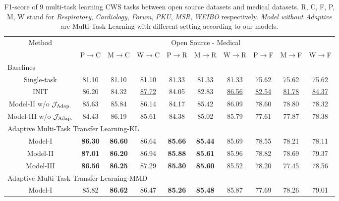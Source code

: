 \begin{table*}[t!]
\small
\centering
\caption{F1-score of 9 multi-task learning CWS tasks between open source datasets and medical datasets. R, C, F, P, M, W stand for \textit{Respiratory}, \textit{Cardiology}, \textit{Forum}, \textit{PKU}, \textit{MSR}, \textit{WEIBO} respectively. \textit{Model without Adaptive} are Multi-Task Learning with different setting according to our models.}\label{table:experiment2}
\begin{tabular}{|c|c|c|c|c|c|c|c|c|c|}
\hline
\multirow{2}{*}{Method} & \multicolumn{9}{c|}{Open Source - Medical} \\ \cline{2-10} & P$\rightarrow$C & M$\rightarrow$C & W$\rightarrow$C & P$\rightarrow$R & M$\rightarrow$R & W$\rightarrow$R & P$\rightarrow$F & M$\rightarrow$F & W$\rightarrow$F \\
\hline
\hline
\multicolumn{10}{|l|}{Baselines} \\
\hline
Single-task & 81.10 & 81.10 & 81.10 & 81.33 & 81.33 & 81.33 & 75.62 & 75.62 & 75.62 \\
\hline
INIT & 86.20 & 84.32 & \underline{87.72} & 84.05 & 82.83 & \underline{86.56} & \underline{82.54} & \underline{81.78} & \underline{84.37}\\
\hline
Model-\RN{2} w/o $\mathcal{J}_\textnormal{Adap.}$ & 85.63 & 85.84 & 86.14 & 84.17 & 85.42 & 86.09 & 78.60 & 78.80 & 78.32\\
\hline
Model-\RN{3} w/o $\mathcal{J}_\textnormal{Adap.}$ & 84.43 & 86.19 & 85.61 & 84.38 & 85.02 & 85.79 & 77.61 & 77.87 & 78.38\\
\hline
\hline
\multicolumn{10}{|l|}{Adaptive Multi-Task Transfer Learning-KL} \\
\hline
Model-\RN{1} & \textbf{86.30} & \textbf{86.60} & 86.64 & \textbf{85.66} & \textbf{85.44} & 85.69 & 78.55 & 78.21 & 78.11\\
\hline
Model-\RN{2} & \textbf{87.01} & \textbf{86.20} & 86.94 & \textbf{85.88} & \textbf{85.61} & 85.96 & 78.82 & 78.69 & 79.37 \\
\hline
Model-\RN{3} & \textbf{86.56} & \textbf{86.25} & 87.29 & \textbf{85.30}  & \textbf{85.60} & 85.52 & 78.20 & 77.45 & 78.56 \\
\hline
\hline
\multicolumn{10}{|l|}{Adaptive Multi-Task Transfer Learning-MMD} \\
\hline
Model-\RN{1} & 85.82 & \textbf{86.62} & 86.47 & \textbf{85.26} & \textbf{85.48} & 85.87 & 77.69 & 78.26 & 79.01 \\

\end{tabular}
\end{table*}
